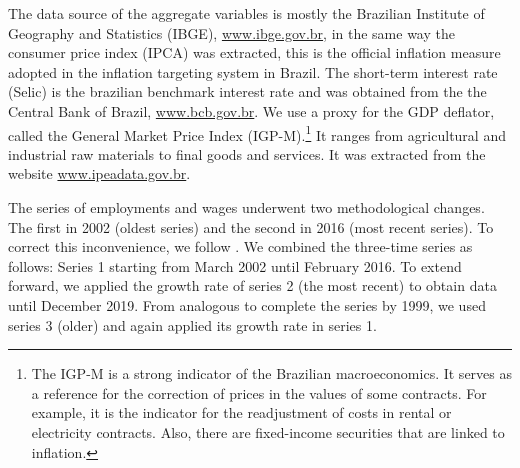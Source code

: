\documentclass[12pt,oneside,a4paper]{article}
\begin{document}
The data source of the aggregate variables is mostly  the Brazilian Institute of Geography and Statistics (IBGE), \url{www.ibge.gov.br}, in the same way the consumer price index (IPCA) was extracted, this is the official inflation measure adopted in the inflation targeting system in Brazil. The short-term interest rate (Selic) is the brazilian benchmark interest rate and was obtained from the the Central Bank of Brazil, \url{www.bcb.gov.br}. We use a proxy for the GDP deflator, called the General Market Price Index (IGP-M).\footnote{The IGP-M is a strong indicator of the Brazilian macroeconomics. It serves as a reference for the correction of prices in the values of some contracts. For example, it is the indicator for the readjustment of costs in rental or electricity contracts. Also, there are fixed-income securities that are linked to inflation.} It ranges from agricultural and industrial raw materials to final goods and services. It was extracted from the website \url{www.ipeadata.gov.br}. 

The series of employments and wages underwent two methodological changes. The first in 2002 (oldest series) and the second in 2016 (most recent series). To correct this inconvenience, we follow \citet{Castro:2015}. We combined the three-time series as follows: Series 1 starting from March 2002 until February 2016. To extend forward, we applied the growth rate of series 2 (the most recent) to obtain data until December 2019. From analogous to complete the series by 1999, we used series 3 (older) and again applied its growth rate in series 1.
\end{document}
